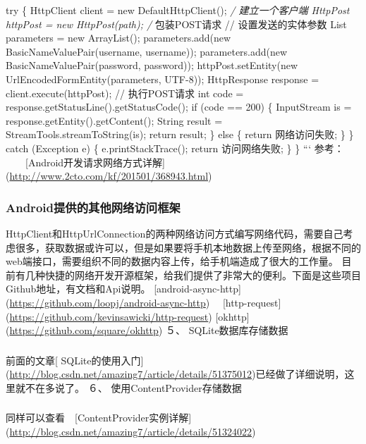 \documentclass[9pt, b5paper]{article}
\begin{document}
\begin{enumerate}
        try \{
            HttpClient client = new DefaultHttpClient(); \emph{/ 建立一个客户端
            HttpPost httpPost = new HttpPost(path); /} 包装POST请求
            // 设置发送的实体参数
            List parameters = new ArrayList();
            parameters.add(new BasicNameValuePair(username, username));
            parameters.add(new BasicNameValuePair(password, password));
            httpPost.setEntity(new UrlEncodedFormEntity(parameters, UTF-8));
            HttpResponse response = client.execute(httpPost); // 执行POST请求
            int code = response.getStatusLine().getStatusCode();
            if (code == 200) \{
                InputStream is = response.getEntity().getContent();
                String result = StreamTools.streamToString(is);
                return result;
            \} else \{
                return 网络访问失败;
            \}
        \} catch (Exception e) \{
            e.printStackTrace();
            return 访问网络失败;
        \}
    \}
``` 
参考：
  　　[Android开发请求网络方式详解](\url{http://www.2cto.com/kf/201501/368943.html})
\end{enumerate}
\subsubsection{Android提供的其他网络访问框架}
\label{sec-7-0-8}
HttpClient和HttpUrlConnection的两种网络访问方式编写网络代码，需要自己考虑很多，获取数据或许可以，但是如果要将手机本地数据上传至网络，根据不同的web端接口，需要组织不同的数据内容上传，给手机端造成了很大的工作量。
目前有几种快捷的网络开发开源框架，给我们提供了非常大的便利。下面是这些项目Github地址，有文档和Api说明。
[android-async-http](\url{https://github.com/loopj/android-async-http})　
[http-request](\url{https://github.com/kevinsawicki/http-request})
[okhttp](\url{https://github.com/square/okhttp})
 ５、 SQLite数据库存储数据
\subsubsection{}
\label{sec-7-0-9}
前面的文章[ SQLite的使用入门](\url{http://blog.csdn.net/amazing7/article/details/51375012})已经做了详细说明，这里就不在多说了。
 ６、 使用ContentProvider存储数据
\subsubsection{}
\label{sec-7-0-10}
同样可以查看　[ContentProvider实例详解](\url{http://blog.csdn.net/amazing7/article/details/51324022})
\end{document}
